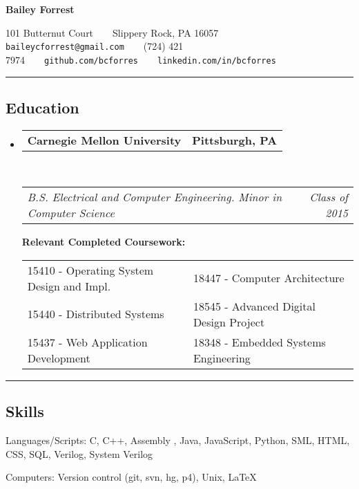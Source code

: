 \documentclass[10pt, letterpaper]{article}
\makeatletter
\newcommand{\titleTopOffset}{-1.0em} %
\newcommand{\titleBotOffset}{-0.4em} %
\newenvironment{indentsection}[1]%
{\begin{list}{}
    {\setlength{\leftmargin}{#1}}
    \item[]
}
{\end{list}}
\newcommand{\headerrow}[2]
{\begin{tabular*}{\linewidth}{l@{\extracolsep{\fill}}r}
    #1 & #2 \\
\end{tabular*}}
\newcommand{\sectionheader}[1]
{\hrule
\vspace{\titleTopOffset}
\subsection*{#1}
\vspace{\titleBotOffset}}
\makeatother
\begin{document}
\begin{center}
{\LARGE \textbf{Bailey Forrest}}

101 Butternut Court\ \ \textbullet \ \ Slippery Rock, PA 16057 \\
\texttt{baileycforrest@gmail.com}\ \ \textbullet \ \ (724) 421 7974\ \ \textbullet \ \ \texttt{github.com/bcforres}\ \ \textbullet \ \ \texttt{linkedin.com/in/bcforres}
\end{center}

\sectionheader{Education}
\begin{itemize}
    \item
        \headerrow
            {\textbf{Carnegie Mellon University}}
            {\textbf{Pittsburgh, PA}}
        \\
        \headerrow
            {\emph{B.S. Electrical and Computer Engineering. Minor in Computer Science}}
            {\emph{Class of 2015}}


        \smallskip
        \textbf{Relevant Completed Coursework:}

        \begin{tabular*}{\linewidth}{p{0.5\linewidth}  p{0.5\linewidth}}
            15410 - Operating System Design and Impl. & 18447 - Computer Architecture \\
            15440 - Distributed Systems & 18545 - Advanced Digital Design Project \\
            15437 - Web Application Development & 18348 - Embedded Systems Engineering \\
        \end{tabular*}
\end{itemize}


\sectionheader{Skills}
\begin{indentsection}{\parindent}
    \begin{description*}
        \item[Languages/Scripts:]
            C, C++, Assembly , Java, JavaScript, Python, SML, HTML, CSS, SQL,
            Verilog, System Verilog

        \item[Computers:]
            Version control (git, svn, hg, p4), Unix, \LaTeX
    \end{description*}
\end{indentsection}
\end{document}

